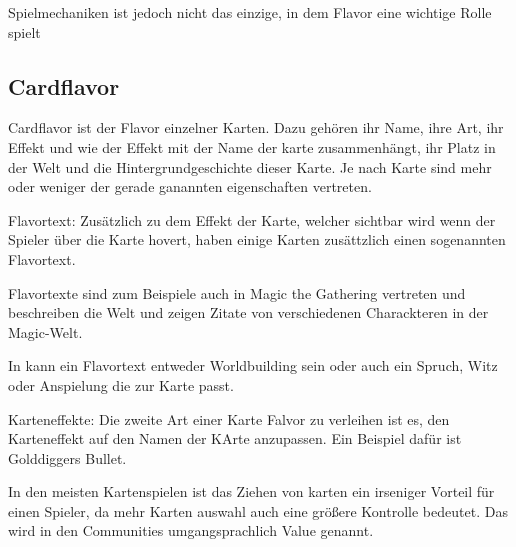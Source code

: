 Spielmechaniken ist jedoch nicht das einzige, in dem Flavor eine wichtige Rolle spielt

%
%

\subsection{Cardflavor}\label{subsec:cardflavor}

Cardflavor ist der Flavor einzelner Karten.
Dazu gehören ihr Name, ihre Art, ihr Effekt und wie der Effekt mit der Name der karte zusammenhängt,
ihr Platz in der Welt und die Hintergrundgeschichte dieser Karte. Je nach Karte sind mehr oder weniger der gerade ganannten
eigenschaften vertreten.


Flavortext:
Zusätzlich zu dem Effekt der Karte, welcher sichtbar wird wenn der Spieler über die Karte hovert, haben einige Karten zusättzlich einen sogenannten Flavortext.


Flavortexte sind zum Beispiele auch in Magic the Gathering vertreten und beschreiben die Welt und zeigen Zitate von verschiedenen Charackteren in der Magic-Welt.\cite{magicarena,soulOfTheGame}%


In \FF kann ein Flavortext entweder Worldbuilding sein oder auch ein Spruch, Witz oder Anspielung die zur Karte passt.


Karteneffekte:
Die zweite Art einer Karte Falvor zu verleihen ist es, den Karteneffekt auf den Namen der KArte anzupassen.
Ein Beispiel dafür ist Golddiggers Bullet.


In den meisten Kartenspielen ist das Ziehen von karten ein irseniger Vorteil
für einen Spieler, da mehr Karten auswahl auch eine größere Kontrolle bedeutet.
Das wird in den Communities umgangsprachlich Value genannt. \cite{whatsvalue}


